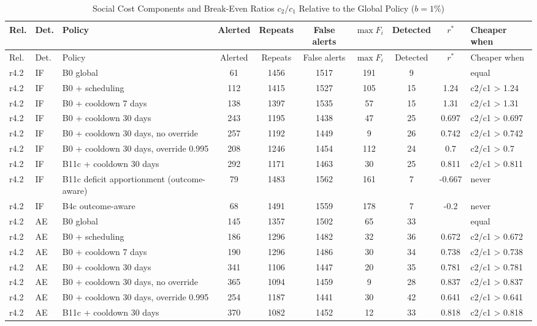 \begin{longtable}{llp{4.6cm}ccccccl}
\caption{Social Cost Components and Break-Even Ratios $c_2/c_1$ Relative to the Global Policy ($b=1\%$)\label{tab:e-l5}}\\
\toprule
Rel. & Det. & Policy & Alerted & Repeats & False alerts & $\max F_i$ & Detected & $r^\ast$ & Cheaper when \\
\midrule
\endfirsthead
\toprule
Rel. & Det. & Policy & Alerted & Repeats & False alerts & $\max F_i$ & Detected & $r^\ast$ & Cheaper when \\
\midrule
\endhead
r4.2 & IF & B0 global & 61 & 1456 & 1517 & 191 & 9 &  & equal \\
r4.2 & IF & B0 + scheduling & 112 & 1415 & 1527 & 105 & 15 & 1.24 & c2/c1 > 1.24 \\
r4.2 & IF & B0 + cooldown 7 days & 138 & 1397 & 1535 & 57 & 15 & 1.31 & c2/c1 > 1.31 \\
r4.2 & IF & B0 + cooldown 30 days & 243 & 1195 & 1438 & 47 & 25 & 0.697 & c2/c1 > 0.697 \\
r4.2 & IF & B0 + cooldown 30 days, no override & 257 & 1192 & 1449 & 9 & 26 & 0.742 & c2/c1 > 0.742 \\
r4.2 & IF & B0 + cooldown 30 days, override 0.995 & 208 & 1246 & 1454 & 112 & 24 & 0.7 & c2/c1 > 0.7 \\
r4.2 & IF & B11c + cooldown 30 days & 292 & 1171 & 1463 & 30 & 25 & 0.811 & c2/c1 > 0.811 \\
r4.2 & IF & B11c deficit apportionment (outcome-aware) & 79 & 1483 & 1562 & 161 & 7 & -0.667 & never \\
r4.2 & IF & B4c outcome-aware & 68 & 1491 & 1559 & 178 & 7 & -0.2 & never \\
r4.2 & AE & B0 global & 145 & 1357 & 1502 & 65 & 33 &  & equal \\
r4.2 & AE & B0 + scheduling & 186 & 1296 & 1482 & 32 & 36 & 0.672 & c2/c1 > 0.672 \\
r4.2 & AE & B0 + cooldown 7 days & 190 & 1296 & 1486 & 30 & 34 & 0.738 & c2/c1 > 0.738 \\
r4.2 & AE & B0 + cooldown 30 days & 341 & 1106 & 1447 & 20 & 35 & 0.781 & c2/c1 > 0.781 \\
r4.2 & AE & B0 + cooldown 30 days, no override & 365 & 1094 & 1459 & 9 & 28 & 0.837 & c2/c1 > 0.837 \\
r4.2 & AE & B0 + cooldown 30 days, override 0.995 & 254 & 1187 & 1441 & 30 & 42 & 0.641 & c2/c1 > 0.641 \\
r4.2 & AE & B11c + cooldown 30 days & 370 & 1082 & 1452 & 12 & 33 & 0.818 & c2/c1 > 0.818 \\

\end{longtable}
